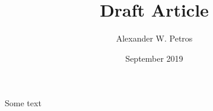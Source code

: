 \documentclass[11pt]{article}
\title{Draft Article}
\author{Alexander W. Petros}
\date{September 2019}
\begin{document}
\maketitle
\newpage

Some text
\end{document}
